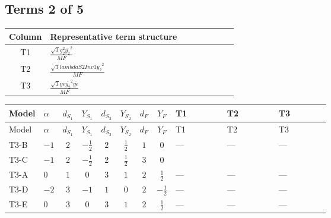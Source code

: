 \documentclass[8pt]{article}
\begin{document}
\begin{landscape}
\subsection*{Terms 2 of 5}
\begin{center}
\begin{tabular}{@{}c >{\raggedright\arraybackslash}p{0.82\linewidth}@{}}
\toprule
Column & Representative term structure \\
\midrule
T1 & \(\displaystyle \frac{\sqrt{3} g_{2}^{2} \overline{y_{2}}^{2}}{MF}\) \\
\midrule
T2 & \(\displaystyle \frac{\sqrt{3} lambdaS2Inv1 \overline{y_{2}}^{2}}{MF}\) \\
\midrule
T3 & \(\displaystyle \frac{\sqrt{3} ye \overline{y_{2}}^{2} \overline{ye}}{MF}\) \\
\midrule
\bottomrule
\end{tabular}
\end{center}
\smallskip
\tiny
\begin{longtable}{@{}llcccccc >{\raggedright\arraybackslash}p{0.21\linewidth} >{\raggedright\arraybackslash}p{0.21\linewidth} >{\raggedright\arraybackslash}p{0.21\linewidth}@{}}
\toprule
Model & $\alpha$ & $d_{S_1}$ & $Y_{S_1}$ & $d_{S_2}$ & $Y_{S_2}$ & $d_F$ & $Y_F$ & T1 & T2 & T3 \\
\midrule
\endfirsthead
\toprule
Model & $\alpha$ & $d_{S_1}$ & $Y_{S_1}$ & $d_{S_2}$ & $Y_{S_2}$ & $d_F$ & $Y_F$ & T1 & T2 & T3 \\
\midrule
\endhead
T3-B & $-1$ & $2$ & $-\frac{1}{2}$ & $2$ & $\frac{1}{2}$ & $1$ & $0$ & --- & --- & --- \\
\midrule
T3-C & $-1$ & $2$ & $-\frac{1}{2}$ & $2$ & $\frac{1}{2}$ & $3$ & $0$ & \scriptsize\adjustbox{max width=\linewidth}{$\begin{gathered} \frac{\sqrt{3} g_{2}^{2} \overline{y_{2}}^{2}}{8 MF}\end{gathered}$} & \scriptsize\adjustbox{max width=\linewidth}{$\begin{gathered} \frac{\sqrt{3} lambdaS2Inv1 \overline{y_{2}}^{2}}{12 MF}\end{gathered}$} & \scriptsize\adjustbox{max width=\linewidth}{$\begin{gathered} - \frac{\sqrt{3} ye \overline{y_{2}}^{2} \overline{ye}}{24 MF}\end{gathered}$} \\
\midrule
T3-A & $0$ & $1$ & $0$ & $3$ & $1$ & $2$ & $\frac{1}{2}$ & --- & --- & --- \\
\midrule
T3-D & $-2$ & $3$ & $-1$ & $1$ & $0$ & $2$ & $-\frac{1}{2}$ & --- & --- & --- \\
\midrule
T3-E & $0$ & $3$ & $0$ & $3$ & $1$ & $2$ & $\frac{1}{2}$ & --- & --- & --- \\
\midrule
\bottomrule
\end{longtable}
\clearpage

\end{landscape}
\end{document}
